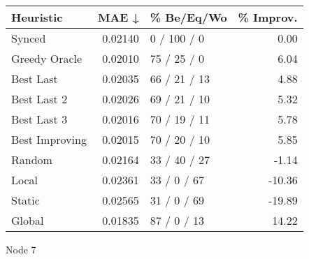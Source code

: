 \begin{tabular}{lrlr}
\toprule
\textbf{Heuristic} & \textbf{MAE ↓} & \textbf{\% Be/Eq/Wo} & \textbf{\% Improv.} \\
\midrule
            Synced &        0.02140 &          0 / 100 / 0 &                0.00 \\
     Greedy Oracle &        0.02010 &          75 / 25 / 0 &                6.04 \\
         Best Last &        0.02035 &         66 / 21 / 13 &                4.88 \\
       Best Last 2 &        0.02026 &         69 / 21 / 10 &                5.32 \\
       Best Last 3 &        0.02016 &         70 / 19 / 11 &                5.78 \\
    Best Improving &        0.02015 &         70 / 20 / 10 &                5.85 \\
            Random &        0.02164 &         33 / 40 / 27 &               -1.14 \\
             Local &        0.02361 &          33 / 0 / 67 &              -10.36 \\
            Static &        0.02565 &          31 / 0 / 69 &              -19.89 \\
            Global &        0.01835 &          87 / 0 / 13 &               14.22 \\
\bottomrule
\end{tabular}
\caption{Node 7}
\label{tab:iid_lr05_le2_bs4_7}
